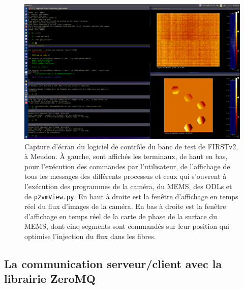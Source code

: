 \begin{figure}[ht!]
    \centering
    \includegraphics[width=\figwidth]{Figure_Chap2/FIRSTv2_ControlSoftware_ScreenShot.png}
    \caption[Capture d'écran du logiciel de contrôle du banc de test de FIRSTv2, à Meudon.]{Capture d'écran du logiciel de contrôle du banc de test de FIRSTv2, à Meudon. À gauche, sont affichés les terminaux, de haut en bas, pour l'exécution des commandes par l'utilisateur, de l'affichage de tous les messages des différents processus et ceux qui s'ouvrent à l'exécution des programmes de la caméra, du MEMS, des ODLs et de \texttt{p2vmView.py}. En haut à droite est la fenêtre d'affichage en temps réel du flux d'images de la caméra. En bas à droite est la fenêtre d'affichage en temps réel de la carte de phase de la surface du MEMS, dont cinq segments sont commandés sur leur position qui optimise l'injection du flux dans les fibres.}
    \label{fig:SoftwareScreenShot}
\end{figure}


\subsection{La communication serveur/client avec la librairie ZeroMQ}
\label{sec:ZMQ}

